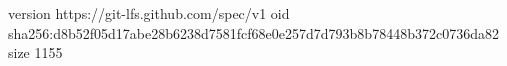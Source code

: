 version https://git-lfs.github.com/spec/v1
oid sha256:d8b52f05d17abe28b6238d7581fcf68e0e257d7d793b8b78448b372c0736da82
size 1155
